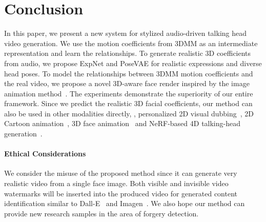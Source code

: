 \section{Conclusion}
\label{sec:conclusion}
In this paper, we present a new system for stylized audio-driven talking head video generation. We use the motion coefficients from 3DMM as an intermediate representation and learn the relationships. To generate realistic 3D coefficients from audio, we propose ExpNet and PoseVAE for realistic expressions and diverse head poses. To model the relationships between 3DMM motion coefficients and the real video, we propose a novel 3D-aware face render inspired by the image animation method~\cite{facevid2vid}. 
The experiments demonstrate the superiority of our entire framework. Since we predict the realistic 3D facial coefficients, our method can also be used in other modalities directly, \ie, personalized 2D visual dubbing~\cite{audiodvp}, 2D Cartoon animation~\cite{zhou2020makelttalk}, 3D face animation~\cite{faceformer,codetalker} and NeRF-based 4D talking-head generation~\cite{headnerf}.

\paragraph{Ethical Considerations} We consider the misuse of
the proposed method since it can generate very realistic video from a single face image. Both visible and invisible video watermarks will be inserted into the produced video for generated content identification similar to Dall-E~\cite{dalle} and Imagen~\cite{imagen}. We also hope our method can provide new research samples in the area of forgery detection.